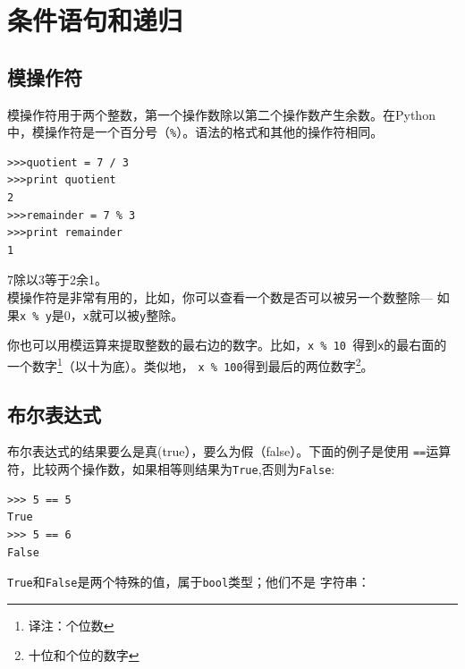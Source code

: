 \chapter{条件语句和递归}

\section{ 模操作符}


模操作符用于两个整数，第一个操作数除以第二个操作数产生余数。在Python
中，模操作符是一个百分号（\verb"%"）。语法的格式和其他的操作符相同。

\beforeverb
\begin{verbatim}
>>>quotient = 7 / 3
>>>print quotient
2
>>>remainder = 7 % 3
>>>print remainder
1
\end{verbatim}
\afterverb

7除以3等于2余1。\\

模操作符是非常有用的，比如，你可以查看一个数是否可以被另一个数整除---
如果{\tt x \% y}是0，{\tt x}就可以被{\tt y}整除。\\


你也可以用模运算来提取整数的最右边的数字。比如，{\tt x \% 10 }得到{\tt x}的最右面的一个数字\footnote{译注：个位数}（以十为底）。类似地，
{\tt x \% 100}得到最后的两位数字\footnote{十位和个位的数字}。

\section{布尔表达式}

布尔表达式的结果要么是真(true），要么为假（false）。下面的例子是使用
{\tt ==}运算符，比较两个操作数，如果相等则结果为{\tt True},否则为{\tt False}:

\beforeverb
\begin{verbatim}
>>> 5 == 5
True
>>> 5 == 6
False
\end{verbatim}
\afterverb

{\tt True}和{\tt False}是两个特殊的值，属于{\tt bool}类型；他们不是
字符串：


